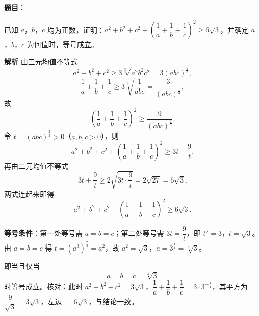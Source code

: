\begin{answer}

\textbf{题目}：

已知 $a$，$b$，$c$ 均为正数，证明：$a^2+b^2+c^2+\left(\dfrac1a+\dfrac1b+\dfrac1c\right)^2\geqslant6\sqrt3$，并确定 $a$，$b$，$c$ 为何值时，等号成立。

\textbf{解析}
由三元均值不等式
\nopagebreak[4]
\[a^2+b^2+c^2\geqslant3\sqrt[3]{a^2b^2c^2}=3(abc)^{\frac23},\]
\nopagebreak[4]
\[\frac1a+\frac1b+\frac1c\geqslant3\sqrt[3]{\frac1{abc}}=\frac{3}{(abc)^{\frac13}},\]
故
\nopagebreak[4]
\[\left(\frac1a+\frac1b+\frac1c\right)^2\geqslant\frac{9}{(abc)^{\frac23}}.\]
令 $t=(abc)^{\frac23}>0$（$a,b,c>0$），则
\nopagebreak[4]
\[a^2+b^2+c^2+\left(\frac1a+\frac1b+\frac1c\right)^2\geqslant3t+\frac9t.\]
再由二元均值不等式
\nopagebreak[4]
\[3t+\frac9t\geqslant2\sqrt{3t\cdot\frac9t}=2\sqrt{27}=6\sqrt3.\]
两式连起来即得
\nopagebreak[4]
\[a^2+b^2+c^2+\left(\frac1a+\frac1b+\frac1c\right)^2\geqslant6\sqrt3.\]

\textbf{等号条件}：第一处等号需 $a=b=c$；第二处等号需 $3t=\dfrac9t$，即 $t^2=3$，$t=\sqrt3$。由 $a=b=c$ 得 $t=(a^3)^{\frac23}=a^2$，故 $a^2=\sqrt3$，$a=3^{\frac14}=\sqrt[4]{3}$。

即当且仅当
\nopagebreak[4]
\[a=b=c=\sqrt[4]{3}\]
时等号成立。核对：此时 $a^2+b^2+c^2=3\sqrt3$，$\dfrac1a+\dfrac1b+\dfrac1c=3\cdot3^{-\frac14}$，其平方为 $\dfrac{9}{\sqrt3}=3\sqrt3$，左边 $=6\sqrt3$，与结论一致。


\end{answer}
